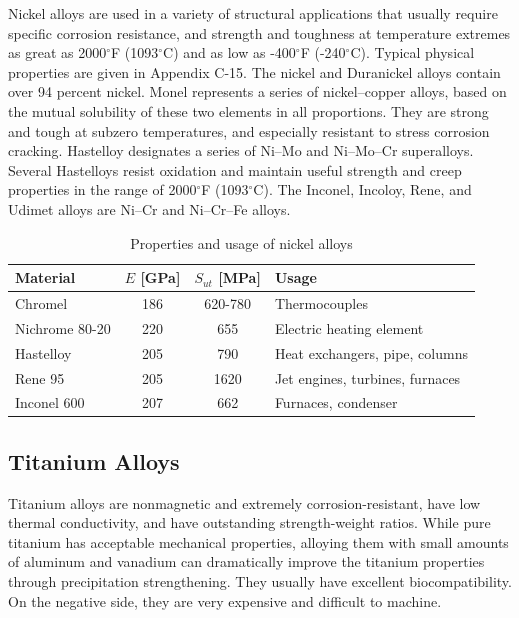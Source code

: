 \documentclass[
10pt,
a4paper,
openany,
svgnames,
]{book}
\begin{document}
Nickel alloys are used in a variety of structural applications that usually require specific corrosion resistance, and strength and toughness at temperature extremes as great as 2000$^{\circ}$F (1093$^{\circ}$C) and as low as -400$^{\circ}$F (-240$^{\circ}$C). Typical physical properties are given in Appendix C-15. The nickel and Duranickel alloys contain over 94 percent nickel. Monel represents a series of nickel–copper alloys, based on the mutual solubility of these two elements in all proportions. They are strong and tough at subzero temperatures, and especially resistant to stress corrosion cracking. Hastelloy designates a series of Ni–Mo and Ni–Mo–Cr superalloys. Several Hastelloys resist oxidation and maintain useful strength and creep properties in the range of 2000$^{\circ}$F (1093$^{\circ}$C). The Inconel, Incoloy, Rene, and Udimet alloys are Ni–Cr and Ni–Cr–Fe alloys. 

\begin{table}[h]
  \centering
  \caption{Properties and usage of nickel alloys}
  \label{tab: nickel alloy props}
  \begin{tabular}{lccl}
    \toprule
    Material & $E$ [GPa] & $S_{ut}$ [MPa] & Usage \\ 
    \midrule
    Chromel & 186 & 620-780 & Thermocouples \\
    Nichrome 80-20 & 220 & 655 & Electric heating element \\
    Hastelloy  & 205 & 790 & Heat exchangers, pipe, columns \\
    Rene 95    &  205   & 1620 & Jet engines, turbines, furnaces \\
    Inconel 600 & 207 & 662  & Furnaces, condenser \\
    \bottomrule
  \end{tabular}
\end{table}

\subsection{Titanium Alloys}

Titanium alloys are nonmagnetic and extremely corrosion-resistant, have low thermal conductivity, and have outstanding strength-weight ratios. While pure titanium has acceptable mechanical properties, alloying them with small amounts of aluminum and vanadium can dramatically improve the titanium properties through precipitation strengthening. They usually have excellent biocompatibility. On the negative side, they are very expensive and difficult to machine. 
\end{document}
